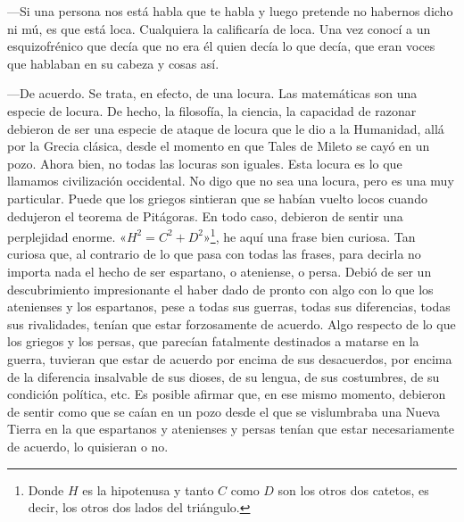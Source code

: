 \documentclass[draft,9pt,letterpaper,twocolumn,openany]{extbook}
\begin{document}
—Si una persona nos está habla que te habla y luego
pretende no habernos dicho ni mú, es que está loca.
Cualquiera la calificaría de loca. Una vez conocí a un
esquizofrénico que decía que no era él quien decía lo que
decía, que eran voces que hablaban en su cabeza y cosas
así.

—De acuerdo. Se trata, en efecto, de una locura. Las
matemáticas son una especie de locura. De hecho, la
filosofía, la ciencia, la capacidad de razonar debieron de ser
una especie de ataque de locura que le dio a la Humanidad,
allá por la Grecia clásica, desde el momento en que Tales
de Mileto se cayó en un pozo. Ahora bien, no todas las
locuras son iguales. Esta locura es lo que llamamos
civilización occidental. No digo que no sea una locura, pero
es una muy particular. Puede que los griegos sintieran que
se habían vuelto locos cuando dedujeron el teorema de
Pitágoras. En todo caso, debieron de sentir una perplejidad
enorme. «$H^2=C^2+D^2$»\footnote{Donde $H$ es la hipotenusa y tanto $C$ como $D$ son los otros dos catetos, es decir, los otros dos lados del triángulo.}, he aquí una frase bien curiosa. Tan
curiosa que, al contrario de lo que pasa con todas las
frases, para decirla no importa nada el hecho de ser
espartano, o ateniense, o persa. Debió de ser un
descubrimiento impresionante el haber dado de pronto con
algo con lo que los atenienses y los espartanos, pese a
todas sus guerras, todas sus diferencias, todas sus
rivalidades, tenían que estar forzosamente de acuerdo. Algo
respecto de lo que los griegos y los persas, que parecían
fatalmente destinados a matarse en la guerra, tuvieran que
estar de acuerdo por encima de sus desacuerdos, por
encima de la diferencia insalvable de sus dioses, de su
lengua, de sus costumbres, de su condición política, etc. Es
posible afirmar que, en ese mismo momento, debieron de
sentir como que se caían en un pozo desde el que se
vislumbraba una Nueva Tierra en la que espartanos y
atenienses y persas tenían que estar necesariamente de
acuerdo, lo quisieran o no.
\end{document}
